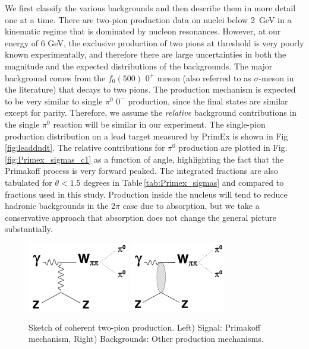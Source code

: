 We first classify the various backgrounds and then describe them in more detail one at a time. There are two-pion production data on nuclei below 2~GeV \cite{schadm2005double} in a kinematic regime that is dominated by nucleon resonances. However, at our energy of 6 GeV, 
the exclusive production of two pions at threshold is very poorly known experimentally, and therefore there are large uncertainties in both the magnitude and the expected distributions of the backgrounds.  The major background comes from the $f_0(500)$ $0^{+}$ meson (also referred to as $\sigma$-meson in the literature) that decays to two pions. The production mechanism is expected to be very similar to single $\pi^0$ $0^{-}$ production, since the final states are similar except for parity. Therefore, we assume the {\em relative} background contributions in the single $\pi^0$ reaction will be similar in our experiment. The single-pion production distribution on a lead target measured by PrimEx \cite{Larin:2018} is shown in Fig\,\ref{fig:leaddndt}. The relative contributions for $\pi^0$ production are plotted in Fig.\,\ref{fig:Primex_sigmas_c1} as a function of angle, highlighting the fact that the Primakoff process is very forward peaked. The integrated fractions are also tabulated for $\theta < 1.5$ degrees in Table\,\ref{tab:Primex_sigmas} and compared to fractions used in this study.
Production inside the nucleus will tend to reduce hadronic backgrounds in the 2$\pi$ case due to absorption, but we take a conservative approach that absorption does not change the general picture substantially. 

 \begin{figure}[tbh]
\begin{center}
\includegraphics[height=3cm,clip=true]{figures/Diagram_Primakoff.png} \hspace{1cm}
\includegraphics[height=3cm,clip=true]{figures/Diagram_hadronic.png}
\caption{Sketch of coherent two-pion production. Left) Signal: Primakoff mechanism, Right) Backgrounds: Other production mechanisms.
\label{fig:Diagram}}
\end{center}
\end{figure}

